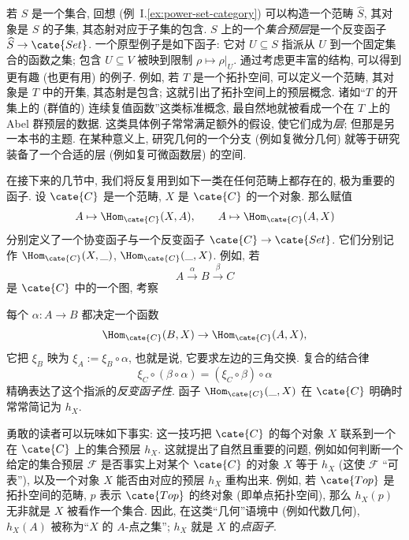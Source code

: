 \begin{example}\label{ex:presheaf-set}
若 $S$ 是一个集合, 回想 (例~I.\ref{ex:power-set-category}) 可以构造一个范畴 $\widehat{S}$, 其对象是 $S$ 的子集, 其态射对应于子集的包含. $S$ 上的一个\emph{集合预层}是一个反变函子 $\widehat{S}\to\cate{Set}$. 一个原型例子是如下函子: 它对 $U\subseteq S$ 指派从 $U$ 到一个固定集合的函数之集; 包含 $U\subseteq V$ 被映到限制 $\rho\mapsto\rho|_U$. 通过考虑更丰富的结构, 可以得到更有趣 (也更有用) 的例子. 例如, 若 $T$ 是一个拓扑空间, 可以定义一个范畴, 其对象是 $T$ 中的开集, 其态射是包含; 这就引出了拓扑空间上的预层概念. 诸如``$T$ 的开集上的 (群值的) 连续复值函数''这类标准概念, 最自然地就被看成一个在 $T$ 上的 Abel 群预层的数据. 这类具体例子常常满足额外的假设, 使它们成为\emph{层}; 但那是另一本书的主题. 在某种意义上, 研究几何的一个分支 (例如复微分几何) 就等于研究装备了一个合适的层 (例如复可微函数层) 的空间.
\end{example}

在接下来的几节中, 我们将反复用到如下一类在任何范畴上都存在的, 极为重要的函子. 设 $\cate{C}$ 是一个范畴, $X$ 是 $\cate{C}$ 的一个对象. 那么赋值
\[
A\mapsto\Hom_{\cate{C}}(X,A),\qquad A\mapsto\Hom_{\cate{C}}(A,X)
\]
分别定义了一个协变函子与一个反变函子 $\cate{C}\to\cate{Set}$. 它们分别记作 $\Hom_{\cate{C}}(X,\_)$, $\Hom_{\cate{C}}(\_,X)$. 例如, 若
\[
A\xrightarrow{\alpha}B\xrightarrow{\beta}C
\]
是 $\cate{C}$ 中的一个图, 考察
\begin{center}
\end{center}
每个 $\alpha:A\to B$ 都决定一个函数
\[
\Hom_{\cate{C}}(B,X)\to\Hom_{\cate{C}}(A,X),
\]
它把 $\xi_B$ 映为 $\xi_A:=\xi_B\circ\alpha$, 也就是说, 它要求左边的三角交换. 复合的结合律
\[
\xi_C\circ(\beta\circ\alpha)=(\xi_C\circ\beta)\circ\alpha
\]
精确表达了这个指派的\emph{反变函子性}. 函子 $\Hom_{\cate{C}}(\_,X)$ 在 $\cate{C}$ 明确时常常简记为 $h_X$.

勇敢的读者可以玩味如下事实: 这一技巧把 $\cate{C}$ 的每个对象 $X$ 联系到一个在 $\cate{C}$ 上的集合预层 $h_X$. 这就提出了自然且重要的问题, 例如如何判断一个给定的集合预层 $\mathcal{F}$ 是否事实上对某个 $\cate{C}$ 的对象 $X$ 等于 $h_X$ (这使 $\mathcal{F}$ ``可表''), 以及一个对象 $X$ 能否由对应的预层 $h_X$ 重构出来. 例如, 若 $\cate{Top}$ 是拓扑空间的范畴, $p$ 表示 $\cate{Top}$ 的终对象 (即单点拓扑空间), 那么 $h_X(p)$ 无非就是 $X$ 被看作一个集合. 因此, 在这类``几何''语境中 (例如代数几何), $h_X(A)$ 被称为``$X$ 的 $A$-点之集''; $h_X$ 就是 $X$ 的\emph{点函子}.

